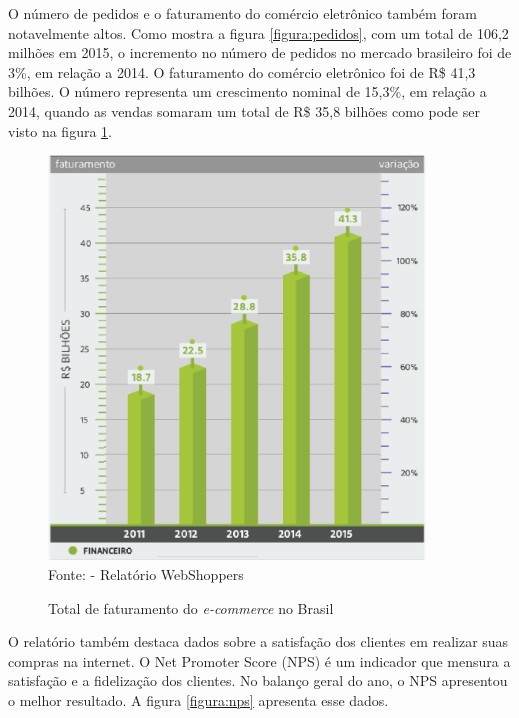 \documentclass[a4paper,12pt]{monografia}
\begin{document}
O número de pedidos e o faturamento do comércio eletrônico também foram notavelmente altos. Como mostra a figura \ref{figura:pedidos}, com um total de 106,2 milhões em 2015, o incremento no número de pedidos no mercado brasileiro foi de 3\%, em relação a 2014. O faturamento do comércio eletrônico foi de R\$ 41,3 bilhões. O número representa um crescimento nominal de 15,3\%, em relação a 2014, quando as vendas somaram um total de R\$ 35,8 bilhões como pode ser visto na figura \ref{figura:vendas}.

\begin{figure}[H]
\centering
\caption{Total de faturamento do \textit{e-commerce} no Brasil}
\centering
\includegraphics[width=10cm]{img/webshoppers/faturamento.eps}\\
\small{Fonte:  - Relatório WebShoppers}
\label{figura:vendas}
\end{figure}

O relatório também destaca dados sobre a satisfação dos clientes em realizar suas compras na internet. O Net Promoter Score (NPS) é um indicador que mensura a satisfação e a fidelização dos clientes. No balanço geral do ano, o NPS apresentou o melhor resultado. A figura \ref{figura:nps} apresenta esse dados.
\end{document}
